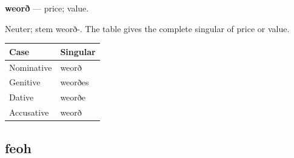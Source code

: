 \par\begin{minipage}{\linewidth}\raggedright
\textbf{weorð} — price; value.

Neuter; stem weorð-. The table gives the complete singular of price or value.

\par\begingroup
\fontsize{10.5}{13.2}\selectfont
\setlength{\LTleft}{0pt}\setlength{\LTright}{\fill}
\noindent
\begin{tabular}{@{}>{\raggedright\arraybackslash}p{60.59mm}>{\raggedright\arraybackslash}p{60.59mm}@{}}
\toprule
\textbf{Case} & \textbf{Singular} \\
\midrule
Nominative & weorð \\
Genitive & weorðes \\
Dative & weorðe \\
Accusative & weorð \\
\bottomrule
\end{tabular}
\par\endgroup

\end{minipage}\par
{}
\subsection*{feoh}

